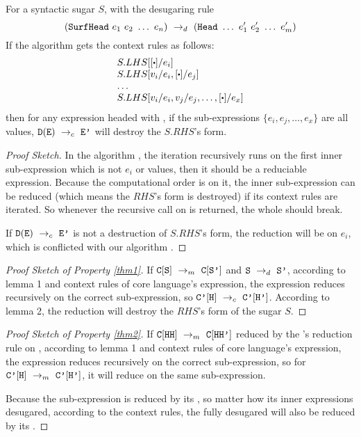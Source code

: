 \begin{lemma}
For a syntactic sugar $S$, with the desugaring rule
\[
(\mbox{\tt SurfHead}~e_1~e_2~\ldots~e_n) ~\rightarrow_d~ (\mbox{\tt Head}~\ldots~e_1'~e_2'~\ldots~e_m')
\]
If the algorithm  gets the context rules as follows:
	\[
		\begin{array}{l}
			S.LHS[[\bigcdot]/e_i]\\
			S.LHS[v_i/e_i, [\bigcdot]/e_j]\\
			\ldots\\
			S.LHS[v_i/e_i, v_j/e_j, \ldots, [\bigcdot]/e_x]\\
		\end{array}
	\]
then for any expression  headed with , if the sub-expressions $\{e_i, e_j, \ldots, e_x\}$ are all values, $\mathtt{D}(\mbox{\tt E}) ~\rightarrow_c~\mbox{\tt E'}$ will destroy the $S.RHS$'s form.
\end{lemma}
\begin{proof}[Proof Sketch]
In the algorithm , the iteration recursively runs on the first inner sub-expression which is not $e_i$ or values, then it should be a reduciable expression. Because the computational order is on it, the inner sub-expression can be reduced (which means the $RHS$'s form is destroyed) if its context rules are iterated. So whenever the recursive call on  is returned, the whole  should break.

If $\mathtt{D}(\mbox{\tt E}) ~\rightarrow_c~\mbox{\tt E'}$ is not a destruction of $S.RHS$'s form, the reduction will be on $e_i$, which is conflicted with our algorithm .
\end{proof}


\begin{proof} [Proof Sketch of Property \ref{thm1}]
If $\mbox{\tt C}[\mbox{\tt S}] ~\rightarrow_m~\mbox{\tt C}[\mbox{\tt S'}]$ and $\mbox{\tt S} ~\rightarrow_d~ \mbox{\tt S'}$, according to lemma 1 and context rules of core language's expression, the expression  reduces recursively on the correct sub-expression, so $\mbox{\tt C'}[\mbox{\tt H}] ~\rightarrow_c~\mbox{\tt C'}[\mbox{\tt H'}]$.
According to lemma 2, the reduction will destroy the $RHS$'s form of the sugar $S$.

\end{proof}

\begin{proof} [Proof Sketch of Property \ref{thm2}]
If $\mbox{\tt C}[\mbox{\tt HH}] ~\rightarrow_m~\mbox{\tt C}[\mbox{\tt HH'}]$ reduced by the 's reduction rule on , according to lemma 1 and context rules of core language's expression, the expression  reduces recursively on the correct sub-expression, so for $\mbox{\tt C'}[\mbox{\tt H}] ~\rightarrow_m~\mbox{\tt C'}[\mbox{\tt H'}]$, it will reduce on the same sub-expression.

Because the sub-expression  is reduced by its , so matter how its inner expressions desugared, according to the context rules, the fully desugared  will also be reduced by its .

\end{proof}

